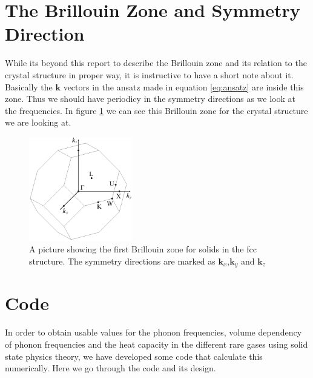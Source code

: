\documentclass[11pt]{article}
\begin{document}
\section{The Brillouin Zone and Symmetry Direction}
While its beyond this report to describe the Brillouin zone and its relation to the crystal structure in proper way, it is instructive to have a short note about it. Basically the $\mathbf{k}$ vectors in the ansatz made in equation \ref{eq:ansatz} are inside this zone. Thus we should have periodicy in the symmetry directions as we look at the frequencies. In figure \ref{fig:fccBrillouin} we can see this Brillouin zone for the crystal structure we are looking at. 
\begin{figure}[H]
	\centering
	\includegraphics[width=0.4\textwidth]{fccBrillouin.png}
	\caption{A picture showing the first Brillouin zone for solids in the fcc structure. The symmetry directions are marked as $\mathbf{k}_x$,$\mathbf{k}_y$ and $\mathbf{k}_z$ }
	\label{fig:fccBrillouin}
\end{figure}

\section{Code}
In order to obtain usable values for the phonon frequencies, volume dependency of phonon frequencies and the heat capacity in the different rare gases using solid state physics theory, we have developed some code that calculate this numerically. Here we go through the code and its design.
\end{document}
